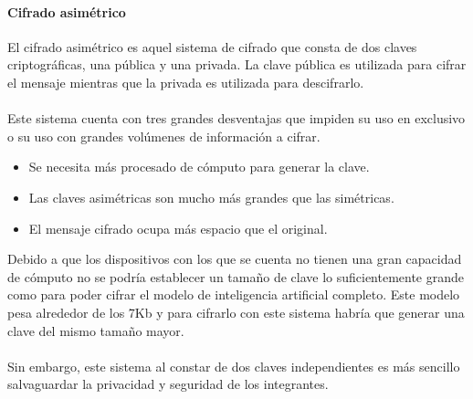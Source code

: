 \paragraph{Cifrado asimétrico}
El cifrado asimétrico es aquel sistema de cifrado que consta de dos claves criptográficas, una pública y una privada. La clave pública es utilizada para cifrar el mensaje mientras que la privada es utilizada para descifrarlo. 
\\ \\
Este sistema cuenta con tres grandes desventajas que impiden su uso en exclusivo o su uso con grandes volúmenes de información a cifrar. 
\begin{itemize}
    \item Se necesita más procesado de cómputo para generar la clave.
    \item Las claves asimétricas son mucho más grandes que las simétricas.
    \item El mensaje cifrado ocupa más espacio que el original.
\end{itemize}

Debido a que los dispositivos con los que se cuenta no tienen una gran capacidad de cómputo no se podría establecer un tamaño de clave lo suficientemente grande como para poder cifrar el modelo de inteligencia artificial completo. Este modelo pesa alrededor de los 7Kb y para cifrarlo con este sistema habría que generar una clave del mismo tamaño mayor.
\\ \\
Sin embargo, este sistema al constar de dos claves independientes es más sencillo salvaguardar la privacidad y seguridad de los integrantes.

